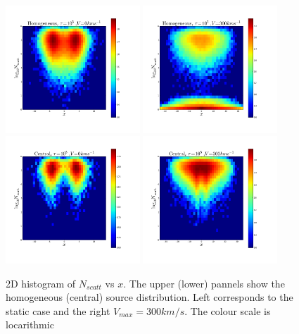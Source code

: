 \documentclass[usenatbib]{mn2e}
\begin{document}
\begin{figure}
     \includegraphics[width=0.45\textwidth]{2dHistogram0t5HOM.png}
     \includegraphics[width=0.45\textwidth]{2dHistogram300t5HOM.png}    \\
     \includegraphics[width=0.45\textwidth]{2dHistogram0t5.png}
     \includegraphics[width=0.45\textwidth]{2dHistogram300t5.png}    

    \caption{2D histogram of $N_{scatt}$ vs $x$. The upper (lower) pannels
      show the homogeneous (central) source distribution. Left
      corresponds to the static case and the right
      $V_{max}=300km/s$. The colour scale is locarithmic\label{fig:Nscatt2D}}  
\end{figure}
\end{document}
